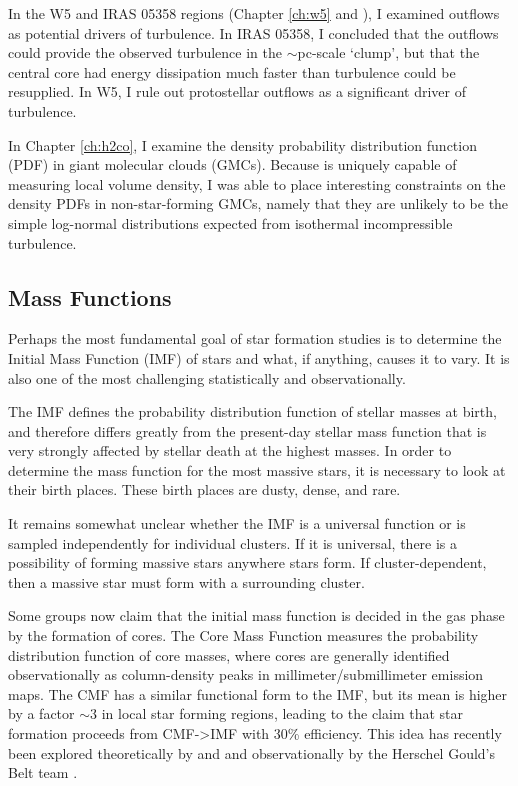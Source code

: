 In the W5 and IRAS 05358 regions (Chapter \ref{ch:w5} and
\citet{Ginsburg2009}), I examined outflows as potential drivers of turbulence.
In IRAS 05358, I concluded that the outflows could provide the observed
turbulence in the $\sim$pc-scale `clump', but that the central core had energy
dissipation much faster than turbulence could be resupplied.  In W5, I rule out
protostellar outflows as a significant driver of turbulence.

In Chapter \ref{ch:h2co}, I examine the density probability distribution
function (PDF) in giant molecular clouds (GMCs).  Because \formaldehyde is
uniquely capable of measuring local volume density, I was able to place
interesting constraints on the density PDFs in non-star-forming GMCs, namely
that they are unlikely to be the simple log-normal distributions expected from
isothermal incompressible turbulence.


\subsection{Mass Functions}
\label{sec:massfunctions}
Perhaps the most fundamental goal of star formation studies is to determine the
Initial Mass Function (IMF) of stars and what, if anything, causes it to vary.
It is also one of the most challenging statistically and observationally.

The IMF defines the probability distribution function of stellar masses at
birth, and therefore differs greatly from the present-day stellar mass function
that is very strongly affected by stellar death at the highest masses.  In
order to determine the mass function for the most massive stars, it is
necessary to look at their birth places.  These birth places are dusty, dense,
and rare.  

It remains somewhat unclear whether the IMF is a universal function or is sampled
independently for individual clusters.  If it is universal, there is a possibility of
forming massive stars anywhere stars form.  If cluster-dependent, then a massive star
must form with a surrounding cluster.

Some groups now claim that the initial mass function is decided in the gas
phase by the formation of cores.  The Core Mass Function measures the
probability distribution function of core masses, where cores are generally
identified observationally as column-density peaks in millimeter/submillimeter
emission maps.  The CMF has a similar functional form to the IMF, but its mean
is higher by a factor $\sim3$ in local star forming regions, leading to the claim
that star formation proceeds from CMF->IMF with 30\% efficiency.
This idea has recently been explored theoretically by \citet{Chabrier2010a} and
\citet{Hopkins2012b} and observationally by the Herschel Gould's Belt team
\citep{Arzoumanian2011a,Andre2010a}.

